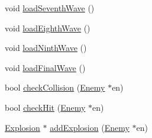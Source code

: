 \begin{DoxyCompactItemize}
void \hyperlink{classGameWidget_a1123e9c18879718d2cd84bc1d55fd60f}{loadSeventhWave} ()
\item 
void \hyperlink{classGameWidget_ad5fc0735c8a36e6968bc95d8ba0289fe}{loadEighthWave} ()
\item 
void \hyperlink{classGameWidget_a6dd247147a23e8a3a35e58e3475a5a38}{loadNinthWave} ()
\item 
void \hyperlink{classGameWidget_a095465d347e3448ab6c05b9ec35e8c4e}{loadFinalWave} ()
\item 
bool \hyperlink{classGameWidget_ab119ec167f9473af790a404afb53114a}{checkCollision} (\hyperlink{classEnemy}{Enemy} $\ast$en)
\item 
bool \hyperlink{classGameWidget_a46e5a8f6be529ef86882d79e92cdb29a}{checkHit} (\hyperlink{classEnemy}{Enemy} $\ast$en)
\item 
\hyperlink{classExplosion}{Explosion} $\ast$ \hyperlink{classGameWidget_a6256883328cf6c7c7b1969a3de226ea7}{addExplosion} (\hyperlink{classEnemy}{Enemy} $\ast$en)
\end{DoxyCompactItemize}

